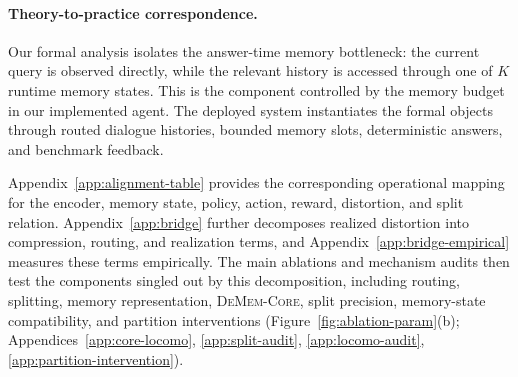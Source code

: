 \documentclass{article}
\theoremstyle{plain}
\theoremstyle{definition}
\theoremstyle{remark}
\begin{document}



\paragraph{Theory-to-practice correspondence.}
Our formal analysis isolates the answer-time memory bottleneck: the current
query is observed directly, while the relevant history is accessed through one
of \(K\) runtime memory states. This is the component controlled by the memory
budget in our implemented agent. The deployed system instantiates the formal
objects through routed dialogue histories, bounded memory slots, deterministic
answers, and benchmark feedback.

Appendix~\ref{app:alignment-table} provides the corresponding operational
mapping for the encoder, memory state, policy, action, reward, distortion, and
split relation. Appendix~\ref{app:bridge} further decomposes realized
distortion into compression, routing, and realization terms, and
Appendix~\ref{app:bridge-empirical} measures these terms empirically. The main
ablations and mechanism audits then test the components singled out by this
decomposition, including routing, splitting, memory representation,
\textsc{DeMem-Core}, split precision, memory-state compatibility, and partition
interventions
(Figure~\ref{fig:ablation-param}(b);
Appendices~\ref{app:core-locomo},
\ref{app:split-audit},
\ref{app:locomo-audit},
\ref{app:partition-intervention}).
\end{document}
